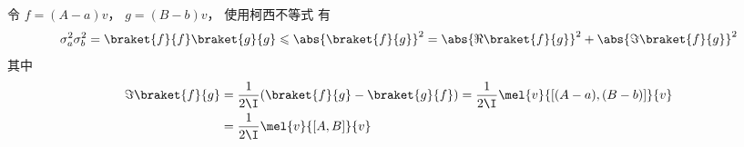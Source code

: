 

令 $f = (A-a)v$， $g = (B-b)v$， 使用柯西不等式 有
\begin{equation}
\sigma_a^2 \sigma_b^2 = \braket{f}{f} \braket{g}{g} \leqslant \abs{\braket{f}{g}}^2 = \abs{\Re\braket{f}{g}}^2 + \abs{\Im\braket{f}{g}}^2
\end{equation}
其中
\begin{equation}
\begin{aligned}
\Im\braket{f}{g} &= \frac{1}{2\I}(\braket{f}{g} - \braket{g}{f})
= \frac{1}{2\I}\mel{v}{[(A-a), (B-b)]}{v}\\
&= \frac{1}{2\I}\mel{v}{[A, B]}{v}
\end{aligned}
\end{equation}
